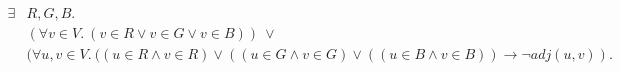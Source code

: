 \documentclass[preview]{standalone}       %
\begin{document}

    \begin{align*}
        \exists & R,G,B. \\
        \ & (\forall v\in V.\ (v\in R \lor v\in G \lor v\in B))\ \lor \\
        & (\forall u,v\in V.\ ((u\in R\land v\in R)\lor ((u\in G\land v\in G)\lor ((u\in B\land v\in B)) \rightarrow \lnot adj(u, v)).
    \end{align*}
\end{document}
